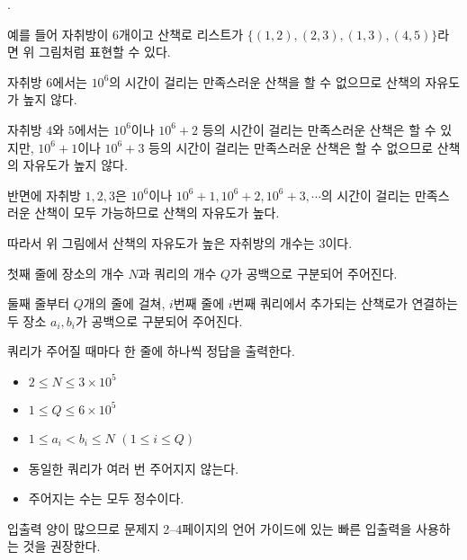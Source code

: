 \begin{problem}{\probno{}. \probtitle{}}

예를 들어 자취방이 $6$개이고 산책로 리스트가 $\{(1,2), (2,3), (1,3), (4,5)\}$라면 위 그림처럼 표현할 수 있다.

자취방 $6$에서는 $10^6$의 시간이 걸리는 만족스러운 산책을 할 수 없으므로 산책의 자유도가 높지 않다.

자취방 $4$와 $5$에서는 $10^6$이나 $10^6+2$ 등의 시간이 걸리는 만족스러운 산책은 할 수 있지만, $10^6+1$이나 $10^6+3$ 등의 시간이 걸리는 만족스러운 산책은 할 수 없으므로 산책의 자유도가 높지 않다.

반면에 자취방 $1,2,3$은 $10^6$이나 $10^6+1, 10^6+2, 10^6+3, \cdots$의 시간이 걸리는 만족스러운 산책이 모두 가능하므로 산책의 자유도가 높다.

따라서 위 그림에서 산책의 자유도가 높은 자취방의 개수는 $3$이다.

\InputFile

첫째 줄에 장소의 개수 $N$과 쿼리의 개수 $Q$가 공백으로 구분되어 주어진다.

둘째 줄부터 $Q$개의 줄에 걸쳐, $i$번째 줄에 $i$번째 쿼리에서 추가되는 산책로가 연결하는 두 장소 $a_i, b_i$가 공백으로 구분되어 주어진다.

\OutputFile

쿼리가 주어질 때마다 한 줄에 하나씩 정답을 출력한다.

\Constraints

\begin{itemize}[noitemsep]
    \item $2 \leq N \leq 3 \times 10^5$
    \item $1 \leq Q \leq 6 \times 10^5$
    \item $1 \leq a_i < b_i \leq N$ $(1 \le i \le Q)$
    \item 동일한 쿼리가 여러 번 주어지지 않는다.
    \item 주어지는 수는 모두 정수이다.
\end{itemize}

\Example

\begin{example}
\end{example}


\Notes
입출력 양이 많으므로 문제지 2--4페이지의 언어 가이드에 있는 빠른 입출력을 사용하는 것을 권장한다.

\end{problem}